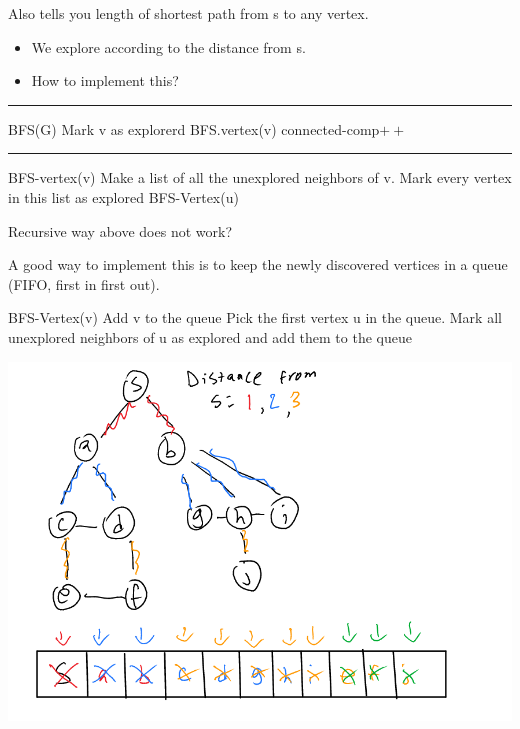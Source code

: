 \documentclass[11pt]{article}
\begin{document}
Also tells you length of shortest path from s to any vertex.
\begin{itemize}
\item We explore according to the distance from s.
\item How to implement this?
\end{itemize}

\noindent\rule{\textwidth}{0.5pt}
\begin{algorithmic}
  \State BFS(G)
  \State Mark v as explorerd
  \State BFS.vertex(v)
  \State connected-comp$++$
  \EndIf
  \EndFor
\end{algorithmic}

\noindent\rule{\textwidth}{0.5pt}
\begin{algorithmic}
  \State BFS-vertex(v)
  \State Make a list of all the unexplored neighbors of v.
  \State Mark every vertex in this list as explored
  \State BFS-Vertex(u)
  \EndFor
\end{algorithmic}
Recursive way above does not work?

A good way to implement this is to keep the newly discovered vertices in a queue (FIFO, first in first out).
\begin{algorithmic}
  \State BFS-Vertex(v)
  \State Add v to the queue
        \State Pick the first vertex u in the queue.
        \State Mark all unexplored neighbors of u as explored and add
        them to the queue
  \EndWhile
\end{algorithmic}
\begin{center}
\includegraphics[width=.9\linewidth]{./Images/i17.png}
\end{center}
\end{document}
